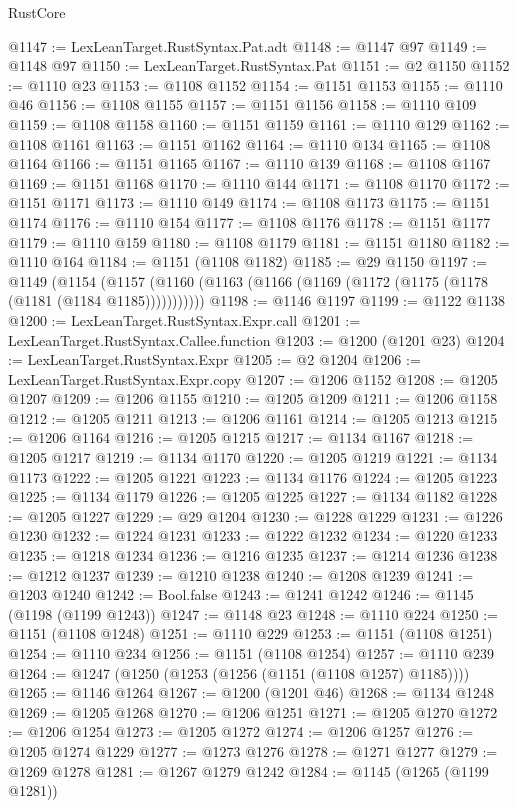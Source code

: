 \begin{lexlean}{RustCore}
\begin{coremodule}
@1147 := LexLeanTarget.RustSyntax.Pat.adt
@1148 := @1147 @97
@1149 := @1148 @97
@1150 := LexLeanTarget.RustSyntax.Pat
@1151 := @2 @1150
@1152 := @1110 @23
@1153 := @1108 @1152
@1154 := @1151 @1153
@1155 := @1110 @46
@1156 := @1108 @1155
@1157 := @1151 @1156
@1158 := @1110 @109
@1159 := @1108 @1158
@1160 := @1151 @1159
@1161 := @1110 @129
@1162 := @1108 @1161
@1163 := @1151 @1162
@1164 := @1110 @134
@1165 := @1108 @1164
@1166 := @1151 @1165
@1167 := @1110 @139
@1168 := @1108 @1167
@1169 := @1151 @1168
@1170 := @1110 @144
@1171 := @1108 @1170
@1172 := @1151 @1171
@1173 := @1110 @149
@1174 := @1108 @1173
@1175 := @1151 @1174
@1176 := @1110 @154
@1177 := @1108 @1176
@1178 := @1151 @1177
@1179 := @1110 @159
@1180 := @1108 @1179
@1181 := @1151 @1180
@1182 := @1110 @164
@1184 := @1151 (@1108 @1182)
@1185 := @29 @1150
@1197 := @1149
    (@1154 (@1157 (@1160 (@1163 (@1166 (@1169 (@1172 (@1175 (@1178 (@1181 (@1184 @1185)))))))))))
@1198 := @1146 @1197
@1199 := @1122 @1138
@1200 := LexLeanTarget.RustSyntax.Expr.call
@1201 := LexLeanTarget.RustSyntax.Callee.function
@1203 := @1200 (@1201 @23)
@1204 := LexLeanTarget.RustSyntax.Expr
@1205 := @2 @1204
@1206 := LexLeanTarget.RustSyntax.Expr.copy
@1207 := @1206 @1152
@1208 := @1205 @1207
@1209 := @1206 @1155
@1210 := @1205 @1209
@1211 := @1206 @1158
@1212 := @1205 @1211
@1213 := @1206 @1161
@1214 := @1205 @1213
@1215 := @1206 @1164
@1216 := @1205 @1215
@1217 := @1134 @1167
@1218 := @1205 @1217
@1219 := @1134 @1170
@1220 := @1205 @1219
@1221 := @1134 @1173
@1222 := @1205 @1221
@1223 := @1134 @1176
@1224 := @1205 @1223
@1225 := @1134 @1179
@1226 := @1205 @1225
@1227 := @1134 @1182
@1228 := @1205 @1227
@1229 := @29 @1204
@1230 := @1228 @1229
@1231 := @1226 @1230
@1232 := @1224 @1231
@1233 := @1222 @1232
@1234 := @1220 @1233
@1235 := @1218 @1234
@1236 := @1216 @1235
@1237 := @1214 @1236
@1238 := @1212 @1237
@1239 := @1210 @1238
@1240 := @1208 @1239
@1241 := @1203 @1240
@1242 := Bool.false
@1243 := @1241 @1242
@1246 := @1145 (@1198 (@1199 @1243))
@1247 := @1148 @23
@1248 := @1110 @224
@1250 := @1151 (@1108 @1248)
@1251 := @1110 @229
@1253 := @1151 (@1108 @1251)
@1254 := @1110 @234
@1256 := @1151 (@1108 @1254)
@1257 := @1110 @239
@1264 := @1247 (@1250 (@1253 (@1256 (@1151 (@1108 @1257) @1185))))
@1265 := @1146 @1264
@1267 := @1200 (@1201 @46)
@1268 := @1134 @1248
@1269 := @1205 @1268
@1270 := @1206 @1251
@1271 := @1205 @1270
@1272 := @1206 @1254
@1273 := @1205 @1272
@1274 := @1206 @1257
@1276 := @1205 @1274 @1229
@1277 := @1273 @1276
@1278 := @1271 @1277
@1279 := @1269 @1278
@1281 := @1267 @1279 @1242
@1284 := @1145 (@1265 (@1199 @1281))

\end{coremodule}
\end{lexlean}

